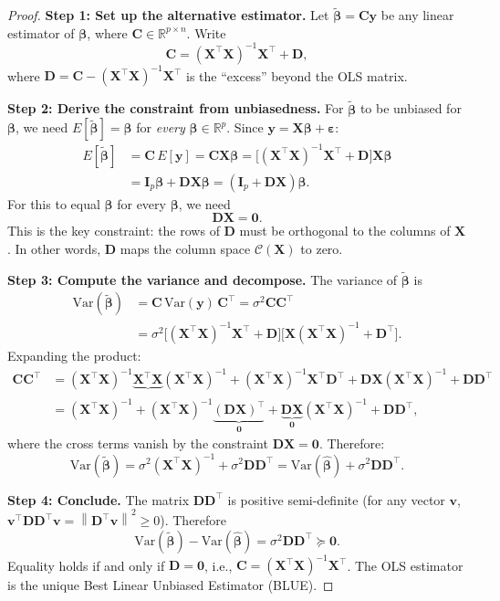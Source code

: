 \documentclass[11pt,a4paper]{article}
\theoremstyle{plain}
\theoremstyle{definition}
\newcommand{\R}{\mathbb{R}}
\newcommand{\bhat}{\hat{\bm{\beta}}}
\newcommand{\btilde}{\tilde{\bm{\beta}}}
\newcommand{\bX}{\bm{X}}
\newcommand{\by}{\bm{y}}
\newcommand{\bI}{\bm{I}}
\newcommand{\bD}{\bm{D}}
\newcommand{\Col}{\mathcal{C}}
\newcommand{\norm}[1]{\left\lVert #1 \right\rVert}
\begin{document}
\begin{proof}
\textbf{Step 1: Set up the alternative estimator.}
Let $\btilde = \bm{C}\by$ be any linear estimator of $\bm{\beta}$, where
$\bm{C}\in\R^{p\times n}$.  Write
\[
  \bm{C} = (\bX^\top\bX)^{-1}\bX^\top + \bD,
\]
where $\bD = \bm{C} - (\bX^\top\bX)^{-1}\bX^\top$ is the ``excess'' beyond
the OLS matrix.

\medskip
\noindent\textbf{Step 2: Derive the constraint from unbiasedness.}
For $\btilde$ to be unbiased for $\bm{\beta}$, we need
$E[\btilde] = \bm{\beta}$ for \emph{every} $\bm{\beta}\in\R^p$.
Since $\by = \bX\bm{\beta} + \bm{\varepsilon}$:
\begin{align*}
  E[\btilde]
  &= \bm{C}\,E[\by]
   = \bm{C}\bX\bm{\beta}
   = \bigl[(\bX^\top\bX)^{-1}\bX^\top + \bD\bigr]\bX\bm{\beta} \\
  &= \bI_p\bm{\beta} + \bD\bX\bm{\beta}
   = (\bI_p + \bD\bX)\bm{\beta}.
\end{align*}
For this to equal $\bm{\beta}$ for every $\bm{\beta}$, we need
\begin{equation}\label{eq:gm-constraint}
  \boxed{\bD\bX = \bm{0}.}
\end{equation}
This is the key constraint: the rows of $\bD$ must be orthogonal to the
columns of $\bX$.  In other words, $\bD$ maps the column space $\Col(\bX)$
to zero.

\medskip
\noindent\textbf{Step 3: Compute the variance and decompose.}
The variance of $\btilde$ is
\begin{align*}
  \text{Var}(\btilde)
  &= \bm{C}\,\text{Var}(\by)\,\bm{C}^\top
   = \sigma^2\bm{C}\bm{C}^\top \\
  &= \sigma^2\bigl[(\bX^\top\bX)^{-1}\bX^\top + \bD\bigr]
              \bigl[\bX(\bX^\top\bX)^{-1} + \bD^\top\bigr].
\end{align*}
Expanding the product:
\begin{align*}
  \bm{C}\bm{C}^\top
  &= (\bX^\top\bX)^{-1}\underbrace{\bX^\top\bX}_{}(\bX^\top\bX)^{-1}
     + (\bX^\top\bX)^{-1}\bX^\top\bD^\top
     + \bD\bX(\bX^\top\bX)^{-1}
     + \bD\bD^\top \\
  &= (\bX^\top\bX)^{-1}
     + (\bX^\top\bX)^{-1}\underbrace{(\bD\bX)^\top}_{\bm{0}}
     + \underbrace{\bD\bX}_{\bm{0}}(\bX^\top\bX)^{-1}
     + \bD\bD^\top,
\end{align*}
where the cross terms vanish by the constraint $\bD\bX = \bm{0}$.
Therefore:
\[
  \text{Var}(\btilde)
  = \sigma^2(\bX^\top\bX)^{-1} + \sigma^2\bD\bD^\top
  = \text{Var}(\bhat) + \sigma^2\bD\bD^\top.
\]

\medskip
\noindent\textbf{Step 4: Conclude.}
The matrix $\bD\bD^\top$ is positive semi-definite (for any vector $\bm{v}$,
$\bm{v}^\top\bD\bD^\top\bm{v} = \norm{\bD^\top\bm{v}}^2 \ge 0$).
Therefore
\[
  \boxed{
  \text{Var}(\btilde) - \text{Var}(\bhat)
  = \sigma^2\bD\bD^\top \succeq \bm{0}.
  }
\]
Equality holds if and only if $\bD = \bm{0}$, i.e., $\bm{C} = (\bX^\top\bX)^{-1}\bX^\top$.
The OLS estimator is the unique Best Linear Unbiased Estimator (BLUE).
\end{proof}
\end{document}

